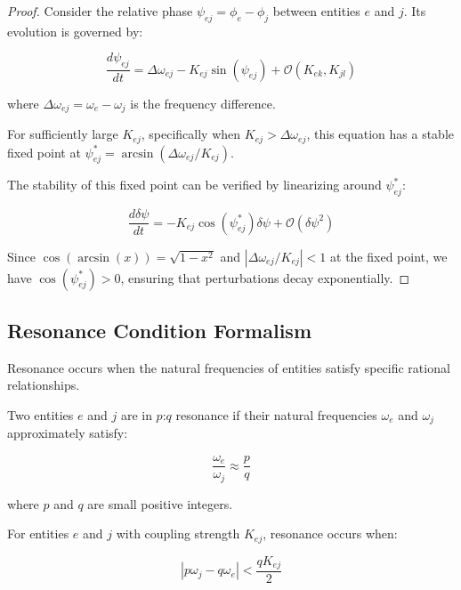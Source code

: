 \begin{proof}
Consider the relative phase $\psi_{ej} = \phi_e - \phi_j$ between entities $e$ and $j$. Its evolution is governed by:

\begin{equation}
\frac{d\psi_{ej}}{dt} = \Delta\omega_{ej} - K_{ej}\sin(\psi_{ej}) + \mathcal{O}(K_{ek}, K_{jl})
\end{equation}

where $\Delta\omega_{ej} = \omega_e - \omega_j$ is the frequency difference.

For sufficiently large $K_{ej}$, specifically when $K_{ej} > \Delta\omega_{ej}$, this equation has a stable fixed point at $\psi_{ej}^* = \arcsin(\Delta\omega_{ej}/K_{ej})$.

The stability of this fixed point can be verified by linearizing around $\psi_{ej}^*$:

\begin{equation}
\frac{d\delta\psi}{dt} = -K_{ej}\cos(\psi_{ej}^*)\delta\psi + \mathcal{O}(\delta\psi^2)
\end{equation}

Since $\cos(\arcsin(x)) = \sqrt{1-x^2}$ and $|\Delta\omega_{ej}/K_{ej}| < 1$ at the fixed point, we have $\cos(\psi_{ej}^*) > 0$, ensuring that perturbations decay exponentially.
\end{proof}

\subsection{Resonance Condition Formalism}

Resonance occurs when the natural frequencies of entities satisfy specific rational relationships.

\begin{definition}
Two entities $e$ and $j$ are in $p$:$q$ resonance if their natural frequencies $\omega_e$ and $\omega_j$ approximately satisfy:

\begin{equation}
\frac{\omega_e}{\omega_j} \approx \frac{p}{q}
\end{equation}

where $p$ and $q$ are small positive integers.
\end{definition}

\begin{theorem}
For entities $e$ and $j$ with coupling strength $K_{ej}$, resonance occurs when:

\begin{equation}
\left|p\omega_j - q\omega_e\right| < \frac{qK_{ej}}{2}
\end{equation}
\end{theorem}


